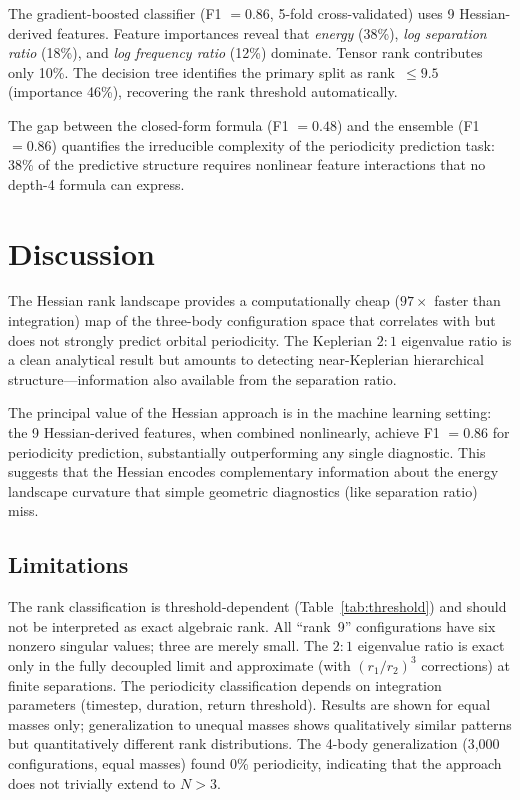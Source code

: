 \documentclass[aps,pre,twocolumn,superscriptaddress,floatfix]{revtex4-2}
\begin{document}
The gradient-boosted classifier (F1 $= 0.86$, 5-fold cross-validated)
uses 9 Hessian-derived features. Feature importances reveal that
\emph{energy} (38\%), \emph{log separation ratio} (18\%), and
\emph{log frequency ratio} (12\%) dominate. Tensor rank contributes
only 10\%. The decision tree identifies the primary split as
rank~$\leq 9.5$ (importance 46\%), recovering the rank threshold
automatically.

The gap between the closed-form formula (F1 $= 0.48$) and the
ensemble (F1 $= 0.86$) quantifies the irreducible complexity of the
periodicity prediction task: 38\% of the predictive structure requires
nonlinear feature interactions that no depth-4 formula can express.

\section{Discussion}

The Hessian rank landscape provides a computationally cheap ($97\times$
faster than integration) map of the three-body configuration space
that correlates with but does not strongly predict orbital periodicity.
The Keplerian $2{:}1$ eigenvalue ratio is a clean analytical result
but amounts to detecting near-Keplerian hierarchical structure---information
also available from the separation ratio.

The principal value of the Hessian approach is in the machine learning
setting: the 9 Hessian-derived features, when combined nonlinearly,
achieve F1 $= 0.86$ for periodicity prediction, substantially
outperforming any single diagnostic. This suggests that the Hessian
encodes complementary information about the energy landscape curvature
that simple geometric diagnostics (like separation ratio) miss.

\subsection{Limitations}

The rank classification is threshold-dependent (Table~\ref{tab:threshold})
and should not be interpreted as exact algebraic rank. All ``rank~9''
configurations have six nonzero singular values; three are merely small.
The $2{:}1$ eigenvalue ratio is exact only in the fully decoupled limit
and approximate (with $(r_1/r_2)^3$ corrections) at finite separations.
The periodicity classification depends on integration parameters (timestep,
duration, return threshold). Results are shown for equal masses only;
generalization to unequal masses shows qualitatively similar patterns
but quantitatively different rank distributions. The 4-body generalization
(3{,}000 configurations, equal masses) found 0\% periodicity, indicating
that the approach does not trivially extend to $N > 3$.
\end{document}
